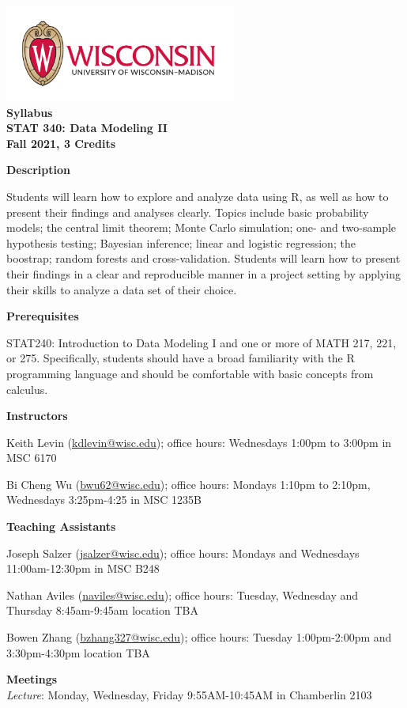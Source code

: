 \documentclass[11pt,oneside]{amsart}
\newcommand{\header}[1]{\bigbreak\textbf{#1}}
\begin{document}
\begin{center}
  \bf
  \includegraphics[width=3in]{color-flush-UWlogo-print} \\
  Syllabus \\
  STAT 340: Data Modeling II \\
  Fall 2021, 3 Credits 
\end{center}

\header{Description}

Students will learn how to explore and analyze data using R, as well as how to present their findings and analyses clearly.
Topics include basic probability models; the central limit theorem; Monte Carlo simulation; one- and two-sample hypothesis testing; Bayesian inference; linear and logistic regression; the boostrap; random forests and cross-validation.
Students will learn how to present their findings in a clear and reproducible manner in a project setting by applying their skills to analyze a data set of their choice.

\header{Prerequisites}

STAT240: Introduction to Data Modeling I
and one or more of MATH 217, 221, or 275.
Specifically, students should have a broad familiarity with the R programming language and should be comfortable with basic concepts from calculus.

\header{Instructors}

Keith Levin (\url{kdlevin@wisc.edu}); office hours: Wednesdays 1:00pm to 3:00pm in MSC 6170

Bi Cheng Wu (\url{bwu62@wisc.edu}); office hours: Mondays 1:10pm to 2:10pm, Wednesdays 3:25pm-4:25 in MSC 1235B

\header{Teaching Assistants}

Joseph Salzer (\url{jsalzer@wisc.edu}); office hours: Mondays and Wednesdays 11:00am-12:30pm in MSC B248

Nathan Aviles (\url{naviles@wisc.edu}); office hours: Tuesday, Wednesday and Thursday 8:45am-9:45am location TBA

Bowen Zhang (\url{bzhang327@wisc.edu}); office hours: Tuesday 1:00pm-2:00pm and 3:30pm-4:30pm location TBA

\header{Meetings}\\
{\em Lecture}: Monday, Wednesday, Friday 9:55AM-10:45AM in Chamberlin 2103
\end{document}
